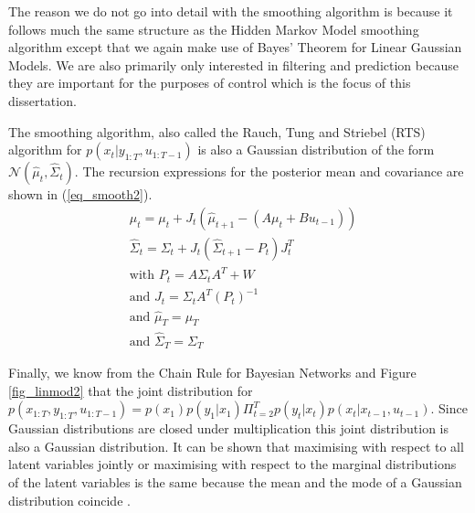 The reason we do not go into detail with the smoothing algorithm is because it follows much the same structure as the Hidden Markov Model smoothing algorithm except that we again make use of Bayes' Theorem for Linear Gaussian Models. We are also primarily only interested in filtering and prediction because they are important for the purposes of control which is the focus of this dissertation.

The smoothing algorithm, also called the Rauch, Tung and Striebel (RTS) algorithm for $p(x_t|y_{1:T},u_{1:T-1})$ is also a Gaussian distribution of the form $\mathcal{N}(\hat{\mu}_t, \hat{\Sigma}_t)$. The recursion expressions for the posterior mean and covariance are shown in (\ref{eq_smooth2}).
\begin{equation}
\begin{aligned}
&\hat{\mu}_t = \mu_t + J_t\left(\hat{\mu}_{t+1}-(A\mu_t+Bu_{t-1})\right) \\
&\hat{\Sigma}_t = \Sigma_t + J_t(\hat{\Sigma}_{t+1}-P_t)J^T_t \\
&\text{with } P_t = A\Sigma_tA^T + W \\
&\text{and } J_t = \Sigma_t A^T (P_t)^{-1}\\
&\text{and } \hat{\mu}_T = \mu_T\\
&\text{and } \hat{\Sigma}_T = \Sigma_T
\end{aligned}
\label{eq_smooth2}
\end{equation}

Finally, we know from the Chain Rule for Bayesian Networks and Figure \ref{fig_linmod2} that the joint distribution for $p(x_{1:T},y_{1:T}, u_{1:T-1}) = p(x_1)p(y_1|x_1)\Pi^T_{t=2} p(y_t|x_t)p(x_{t}|x_{t-1},u_{t-1})$. Since Gaussian distributions are closed under multiplication this joint distribution is also a Gaussian distribution. It can be shown that maximising with respect to all latent variables jointly or maximising with respect to the marginal distributions of the latent variables is the same because the mean and the mode of a Gaussian distribution coincide \cite{barber}.

